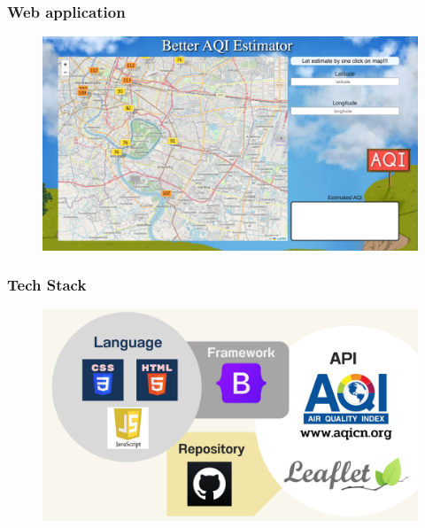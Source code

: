 \documentclass[12pt,aspectratio=169]{beamer}
\begin{document}
\begin{frame}
    \frametitle{Web application}
        \begin{center}
            \begin{figure}
                \centering
                \includegraphics[width=\textwidth]{img/web-app.jpeg}
            \end{figure}
        \end{center}
    \end{frame}

\begin{frame}
\frametitle{Tech Stack}
    \begin{center}
        \begin{figure}
            \centering
            \includegraphics[width=\textwidth]{img/tech-stack.pdf}
        \end{figure}
    \end{center}
\end{frame}
\end{document}
